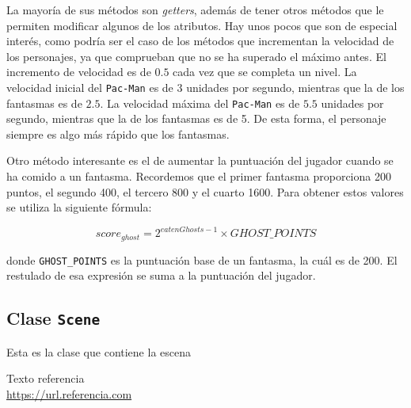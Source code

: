 \documentclass[11pt,a4paper]{article}
\begin{document}
La mayoría de sus métodos son \textit{getters}, además de tener otros métodos que le
permiten modificar algunos de los atributos. Hay unos pocos que son de especial interés, como
podría ser el caso de los métodos que incrementan la velocidad de los personajes, ya que
comprueban que no se ha superado el máximo antes. El incremento de velocidad es de $0.5$ cada
vez que se completa un nivel. La velocidad inicial del \texttt{Pac-Man} es de 3 unidades por
segundo, mientras que la de los fantasmas es de $2.5$. La velocidad máxima del \texttt{Pac-Man} es
de $5.5$ unidades por segundo, mientras que la de los fantasmas es de 5. De esta forma, el
personaje siempre es algo más rápido que los fantasmas.

Otro método interesante es el de aumentar la puntuación del jugador cuando se ha comido a un
fantasma. Recordemos que el primer fantasma proporciona 200 puntos, el segundo 400, el tercero 800
y el cuarto 1600. Para obtener estos valores se utiliza la siguiente fórmula:

\begin{equation}
score_{ghost} = 2^{eatenGhosts - 1} \times GHOST\_POINTS
\end{equation}

\noindent donde \texttt{GHOST\_POINTS} es la puntuación base de un fantasma, la cuál es de 200.
El restulado de esa expresión se suma a la puntuación del jugador.

\subsection{Clase \texttt{Scene}}

Esta es la clase que contiene la escena 

\newpage

\begin{thebibliography}{5}

Texto referencia
\\\url{https://url.referencia.com}

\end{thebibliography}
\end{document}
